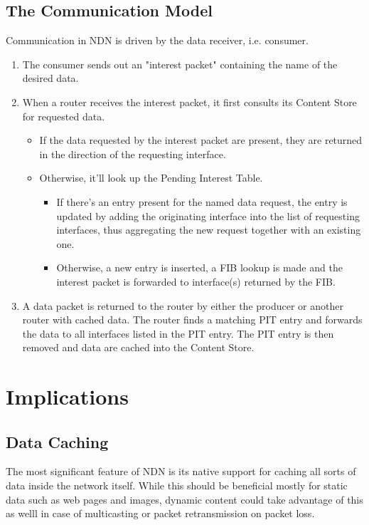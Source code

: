             \subsection{The Communication Model}

            Communication in NDN is driven by the data receiver, i.e. consumer.

            \begin{enumerate}
                \item The consumer sends out an "interest packet" containing the name of the desired data.
                \item When a router receives the interest packet, it first consults its Content Store for requested data.
                    \begin{itemize}
                        \item If the data requested by the interest packet are present, they are returned in the direction of the requesting interface.
                        \item Otherwise, it'll look up the Pending Interest Table.
                        \begin{itemize}
                            \item If there's an entry present for the named data request, the entry is updated by adding the originating interface into the list of requesting interfaces, thus aggregating the new request together with an existing one.
                            \item Otherwise, a new entry is inserted, a FIB lookup is made and the interest packet is forwarded to interface(s) returned by the FIB.
                        \end{itemize}
                    \end{itemize}
                \item A data packet is returned to the router by either the producer or another router with cached data. The router finds a matching PIT entry and forwards the data to all interfaces listed in the PIT entry. The PIT entry is then removed and data are cached into the Content Store.
            \end{enumerate}

    \section{Implications}
        \subsection{Data Caching}
            The most significant feature of NDN is its native support for caching all sorts of data inside the network itself. While this should be beneficial mostly for static data such as web pages and images, dynamic content could take advantage of this as welll in case of multicasting or packet retransmission on packet loss.

